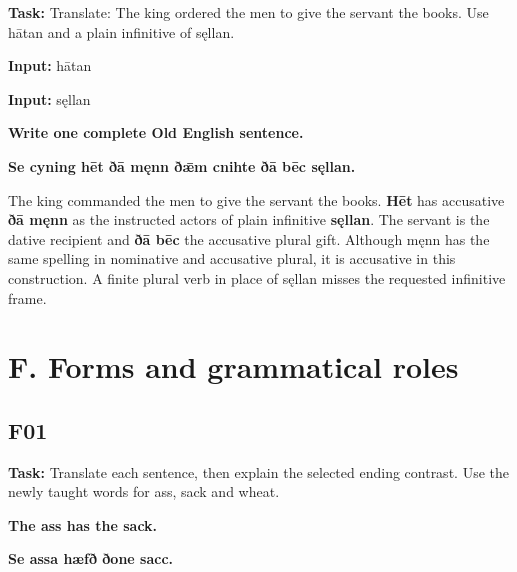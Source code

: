 \textbf{Task:} Translate: The king ordered the men to give the servant the books. Use hātan and a plain infinitive of sęllan.

\textbf{Input:} hātan

\textbf{Input:} sęllan

\par\begin{minipage}{\linewidth}\raggedright
\textbf{Write one complete Old English sentence.}

\textbf{Se cyning hēt ðā męnn ðǣm cnihte ðā bēc sęllan.}
\end{minipage}\par

The king commanded the men to give the servant the books. \textbf{Hēt} has accusative \textbf{ðā męnn} as the instructed actors of plain infinitive \textbf{sęllan}. The servant is the dative recipient and \textbf{ðā bēc} the accusative plural gift. Although męnn has the same spelling in nominative and accusative plural, it is accusative in this construction. A finite plural verb in place of sęllan misses the requested infinitive frame.

\clearpage
\section*{F. Forms and grammatical roles}

\subsection*{F01}

\textbf{Task:} Translate each sentence, then explain the selected ending contrast. Use the newly taught words for ass, sack and wheat.

\par\begin{minipage}{\linewidth}\raggedright
\textbf{The ass has the sack.}

\textbf{Se assa hæfð ðone sacc.}
\end{minipage}\par

